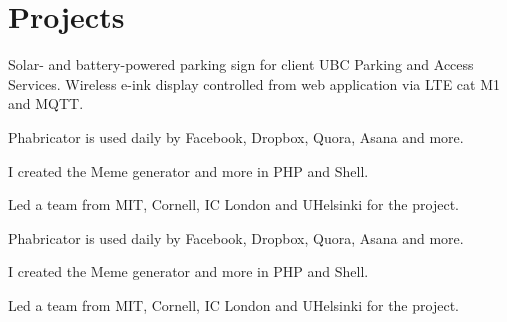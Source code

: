 \documentclass[]{deedy-resume-openfont}
\begin{document}
\begin{minipage}[t]{0.66\textwidth}
\section{Projects}

\href{https://www.youtube.com/watch?v=WxmXLgdtLPQ}{}
Solar- and battery-powered parking sign for client UBC Parking and Access Services. Wireless e-ink display controlled from web application via LTE cat M1 and MQTT. 
\begin{tightemize}
\item Phabricator is used daily by Facebook, Dropbox, Quora, Asana and more.
\item I created the Meme generator and more in PHP and Shell.
\item Led a team from MIT, Cornell, IC London and UHelsinki for the project.
\end{tightemize}
\sectionsep
{}
\begin{tightemize}
\item Phabricator is used daily by Facebook, Dropbox, Quora, Asana and more.
\item I created the Meme generator and more in PHP and Shell.
\item Led a team from MIT, Cornell, IC London and UHelsinki for the project.
\end{tightemize}
\sectionsep

\end{minipage} 
\end{document}
